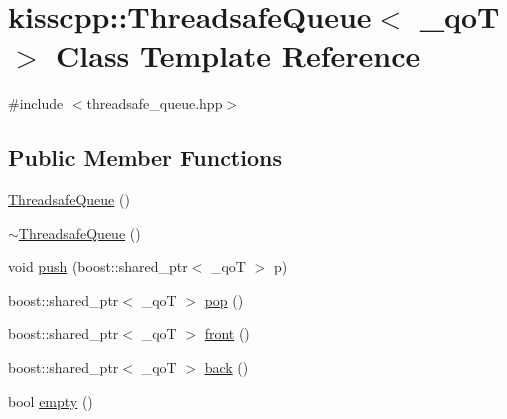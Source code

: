 \hypertarget{classkisscpp_1_1_threadsafe_queue}{\section{kisscpp\-:\-:Threadsafe\-Queue$<$ \-\_\-qo\-T $>$ Class Template Reference}
\label{classkisscpp_1_1_threadsafe_queue}
}


{\ttfamily \#include $<$threadsafe\-\_\-queue.\-hpp$>$}

\subsection*{Public Member Functions}
\begin{DoxyCompactItemize}
\item 
\hyperlink{classkisscpp_1_1_threadsafe_queue_a77e614d9676f60c19e0eaa4c50f3f804}{Threadsafe\-Queue} ()
\item 
\hyperlink{classkisscpp_1_1_threadsafe_queue_ac561918dd6c95c7334b2e56917a74567}{$\sim$\-Threadsafe\-Queue} ()
\item 
void \hyperlink{classkisscpp_1_1_threadsafe_queue_aaca1e00d06c1eb749f6a293d1ca07a7d}{push} (boost\-::shared\-\_\-ptr$<$ \-\_\-qo\-T $>$ p)
\item 
boost\-::shared\-\_\-ptr$<$ \-\_\-qo\-T $>$ \hyperlink{classkisscpp_1_1_threadsafe_queue_a0bbccaf15a770fd0b3b16b85ed957c8d}{pop} ()
\item 
boost\-::shared\-\_\-ptr$<$ \-\_\-qo\-T $>$ \hyperlink{classkisscpp_1_1_threadsafe_queue_abb61873eafe8958aad8f6bca8f00a4b3}{front} ()
\item 
boost\-::shared\-\_\-ptr$<$ \-\_\-qo\-T $>$ \hyperlink{classkisscpp_1_1_threadsafe_queue_ad6f26dad2d2e9111c8c06f3dbda04c76}{back} ()
\item 
bool \hyperlink{classkisscpp_1_1_threadsafe_queue_a3fa0826aed79b1164a45eb0517248819}{empty} ()
\end{DoxyCompactItemize}


